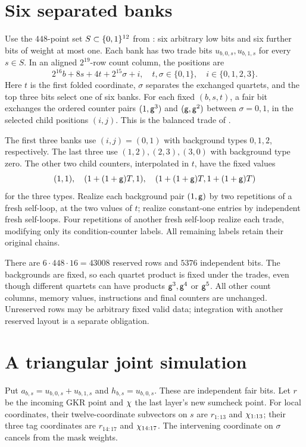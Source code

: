 \documentclass[11pt]{article}
\begin{document}
\section{Six separated banks}

Use the $448$-point set $S\subset\{0,1\}^{12}$ from : six arbitrary low bits and six further bits of weight at most one. Each bank has two trade bits $u_{b,0,s},u_{b,1,s}$ for every $s\in S$. In an aligned $2^{19}$-row count column, the positions are
\[
 2^{16}b+8s+4t+2^{15}\sigma+i,
 \quad t,\sigma\in\{0,1\},\quad i\in\{0,1,2,3\}.
\]
Here $t$ is the first folded coordinate, $\sigma$ separates the exchanged quartets, and the top three bits select one of six banks. For each fixed $(b,s,t)$, a fair bit exchanges the ordered counter pairs $(1,\mathsf{g}^3)$ and $(\mathsf{g},\mathsf{g}^2)$ between $\sigma=0,1$, in the selected child positions $(i,j)$. This is the balanced trade of .

The first three banks use $(i,j)=(0,1)$ with background types $0,1,2$, respectively. The last three use $(1,2),(2,3),(3,0)$ with background type zero. The other two child counters, interpolated in $t$, have the fixed values
\[
 (1,1),\quad (1+(1+\mathsf{g})T,1),\quad
 (1+(1+\mathsf{g})T,1+(1+\mathsf{g})T)
\]
for the three types. Realize each background pair $(1,\mathsf{g})$ by two repetitions of a fresh self-loop, at the two values of $t$; realize constant-one entries by independent fresh self-loops. Four repetitions of another fresh self-loop realize each trade, modifying only its condition-counter labels. All remaining labels retain their original chains.

There are $6\cdot448\cdot16=43008$ reserved rows and $5376$ independent bits. The backgrounds are fixed, so each quartet product is fixed under the trades, even though different quartets can have products $\mathsf{g}^3,\mathsf{g}^4$ or $\mathsf{g}^5$. All other count columns, memory values, instructions and final counters are unchanged. Unreserved rows may be arbitrary fixed valid data; integration with another reserved layout is a separate obligation.

\section{A triangular joint simulation}

Put $a_{b,s}=u_{b,0,s}+u_{b,1,s}$ and $h_{b,s}=u_{b,0,s}$. These are independent fair bits. Let $r$ be the incoming GKR point and $\chi$ the last layer's new sumcheck point. For local coordinates, their twelve-coordinate subvectors on $s$ are $r_{1:13}$ and $\chi_{1:13}$; their three tag coordinates are $r_{14:17}$ and $\chi_{14:17}$. The intervening coordinate on $\sigma$ cancels from the mask weights.
\end{document}
